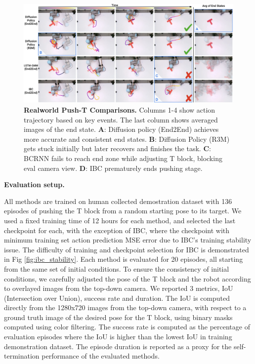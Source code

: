 \begin{figure}
\centering
\includegraphics[width=\linewidth]{figure/real_results.pdf}

\caption{\textbf{Realworld Push-T Comparisons.} 
\label{fig:real_pusht_comparison}
Columns 1-4 show action trajectory based on key events. The last column shows averaged images of the end state. 
\textbf{A}: Diffusion policy (End2End) achieves more accurate and consistent end states.
\textbf{B}: Diffusion Policy (R3M) gets stuck initially but later recovers and finishes the task. 
\textbf{C}: BCRNN fails to reach end zone while adjusting T block, blocking eval camera view.
\textbf{D}: IBC prematurely ends pushing stage.
}

\end{figure}

\textbf{Evaluation setup.} 

 


All methods are trained on human collected demostration dataset with 136 episodes of pushing the T block from a random starting pose to its target. We used a fixed training time of 12 hours for each method, and selected the last checkpoint for each, with the exception of IBC, where the checkpoint with minimum training set action prediction MSE error due to IBC's training stability issue. The difficulty of training and checkpoint selection for IBC is demonstrated in Fig \ref{fig:ibc_stability}. Each method is evaluated for 20 episodes, all starting from the same set of initial conditions. To ensure the consistency of initial conditions, we carefully adjusted the pose of the T block and the robot according to overlayed images from the top-down camera. We reported 3 metrics, IoU (Intersection over Union), success rate and duration. The IoU is computed directly from the 1280x720 images from the top-down camera, with respect to a ground truth image of the desired pose for the T block, using binary masks computed using color filtering. The success rate is computed as the percentage of evaluation episodes where the IoU is higher than the lowest IoU in training demonstration dataset. 
The episode duration is reported as a proxy for the self-termination performance of the evaluated methods.

